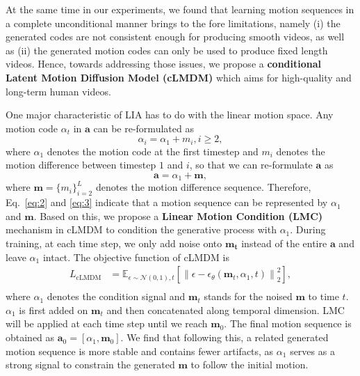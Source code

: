 At the same time in our experiments, we found that learning motion sequences in a complete unconditional manner brings to the fore limitations, namely (i) the generated codes are not consistent enough for producing smooth videos, as well as (ii) the generated motion codes can only be used to produce fixed length videos. Hence, towards addressing those issues, we propose a \textbf{conditional Latent Motion Diffusion Model (cLMDM)} which aims for high-quality and long-term human videos.    

One major characteristic of LIA has to do with the linear motion space. Any motion code $\alpha_t$ in $\mathbf{a}$ can be re-formulated as
\begin{equation}\label{eq:2}
    \alpha_{i} = \alpha_{1} + m_{i}, i\ge 2,
\end{equation}
where $\alpha_{1}$ denotes the motion code at the first timestep and $m_{i}$ denotes the motion difference between timestep $1$ and $i$, so that we can re-formulate $\mathbf{a}$ as
\begin{equation}\label{eq:3}
    \mathbf{a} = \alpha_{1} + \mathbf{m},
\end{equation}
where $\mathbf{m}=\{m_i\}^{L}_{i=2}$ denotes the motion difference sequence. Therefore, Eq.~\ref{eq:2} and \ref{eq:3} indicate that a motion sequence can be represented by $\alpha_{1}$ and $\mathbf{m}$. Based on this, we propose a \textbf{Linear Motion Condition (LMC)} mechanism in cLMDM to condition the generative process with $\alpha_1$. During training, at each time step, we only add noise onto $\mathbf{m_t}$ instead of the entire $\mathbf{a}$ and leave $\alpha_1$ intact. The objective function of cLMDM is
\begin{equation}
\begin{split}
    L_{\text{cLMDM}} &= \mathbb{E}_{\epsilon \sim \mathcal{N} (0,1), t}\left [ \left \| \epsilon - \epsilon_{\theta}(\mathbf{m}_{t}, \alpha_1, t)\right \|^{2}_{2}\right], \\
\end{split}
\end{equation}
where $\alpha_{1}$ denotes the condition signal and $\mathbf{m}_t$ stands for the noised $\mathbf{m}$ to time $t$. $\alpha_1$ is first added on $\mathbf{m}_t$ and then concatenated along temporal dimension. LMC will be applied at each time step until we reach $\mathbf{m}_0$. The final motion sequence is obtained as $\mathbf{a}_0 = [\alpha_1, \mathbf{m}_0]$. We find that following this, a related generated motion sequence is more stable and contains fewer artifacts, as $\alpha_1$ serves as a strong signal to constrain the generated $\mathbf{m}$ to follow the initial motion. 

